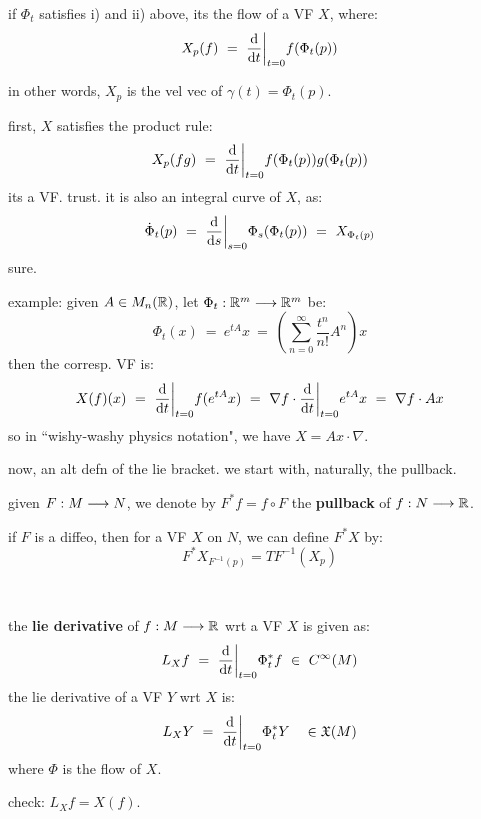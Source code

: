 \begin{prop}
	if $\Phi_{t}$ satisfies i) and ii) above, its the flow of a VF $X$, where:
	\begin{equation*}
		X_{p}(f) \ = \ \frac{\textrm{d}}{\textrm{d} t}\bigg\rvert_{t=0}f(\Phi_{t}(p))
	\end{equation*}
\end{prop}
in other words, $X_{p}$ is the vel vec of $\gamma(t)=\Phi_{t}(p)$.

\begin{pf}
	first, $X$ satisfies the product rule:
	\begin{equation*}
		X_{p}(fg) \ = \ \frac{\d}{\d t}\bigg\rvert_{t=0}f(\Phi_{t}(p))g(\Phi_{t}(p))
	\end{equation*}
	its a VF. trust. it is also an integral curve of $X$, as:
	\begin{equation*}
		\dot{\Phi}_{t}(p) \ = \ \frac{\textrm{d}}{\textrm{d} s}\bigg\rvert_{s=0}\Phi_{s}(\Phi_{t}(p)) \ = \ X_{\Phi_{t}(p)}
	\end{equation*}
	sure.
\end{pf}

example: given $A\in M_{n}(\mathbb{R})$, let $\Phi_{t}:\mathbb{R}^{m}\longrightarrow\mathbb{R}^{m}$ be:
\begin{equation*}
	\Phi_{t}(x) \ = \ e^{tA}x \ = \ \left(\sum_{n=0}^{\infty}\frac{t^{n}}{n!}A^{n}\right)x
\end{equation*}
then the corresp. VF is:
\begin{equation*}
	X(f)(x) \ = \ \frac{\d}{\d t}\bigg\rvert_{t=0}f(e^{tA}x)
	\ = \ \nabla f\cdot\frac{\d}{\d t}\bigg\rvert_{t=0}e^{tA}x
	\ = \ \nabla f\cdot Ax
\end{equation*}
so in ``wishy-washy physics notation", we have $X=Ax\cdot\nabla$.

now, an alt defn of the lie bracket.
we start with, naturally, the pullback.

\begin{defn}
	given $F:M\longrightarrow N$, we denote by $F^{*}f=f\circ F$ the \textbf{pullback} of $f:N\longrightarrow\mathbb{R}$.

	if $F$ is a diffeo, then for a VF $X$ on $N$, we can define $F^{*}X$ by:
	\begin{equation*}
		F^{*}X_{F^{-1}(p)}=TF^{-1}(X_{p})
	\end{equation*}
\end{defn} \

\begin{defn}
	the \textbf{lie derivative} of $f:M\longrightarrow\mathbb{R}$ wrt a VF $X$ is given as:
	\begin{equation*}
		L_{X}f \ = \ \frac{\textrm{d}}{\textrm{d} t}\bigg\rvert_{t=0}\Phi_{t}^{*}f \ \in \ C^{\infty}(M)
	\end{equation*}
	the lie derivative of a VF $Y$ wrt $X$ is:
	\begin{equation*}
		L_{X}Y \ = \ \frac{\textrm{d}}{\textrm{d} t}\bigg\rvert_{t=0}\Phi_{t}^{*}Y \quad \in \mathfrak{X}(M)
	\end{equation*}
	where $\Phi$ is the flow of $X$.
\end{defn}
check: $L_{X}f=X(f)$.

